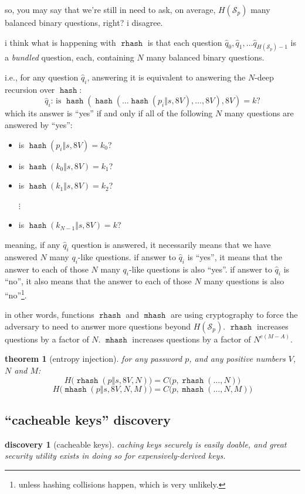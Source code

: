\documentclass[twocolumn]{article}
\newtheorem{theorem}{theorem}
\newtheorem{discovery}{discovery}
\DeclareMathOperator{\hash}{\mathtt{hash}}
\DeclareMathOperator{\rhash}{\mathtt{rhash}}
\DeclareMathOperator{\mhash}{\mathtt{mhash}}
\begin{document}
so, you may say that we're still in need to ask, on average,
$H(\mathcal{S}_p)$ many balanced binary questions, right?  i disagree.

i think what is happening with $\rhash$ is that each question $\hat q_0,
\hat q_1, \ldots \hat q_{H(\mathcal{S}_p)-1}$ is a \emph{bundled} question,
each, containing $N$ many balanced binary questions.

i.e., for any question $\hat q_i$, answering it is equivalent to answering
the $N$-deep recursion over $\hash$:
\[
    \text{$\hat q_i$: is }\hash(\hash(\ldots\hash(p_i \Vert s, 8V), \ldots,
    8V), 8V) = k \text{?}
\]
which its answer is ``yes'' if and only if all of the following $N$ many
questions are answered by ``yes'':
\begin{itemize}
    \item is $\hash(p_i \Vert s, 8V) = k_0$?
    \item is $\hash(k_0 \Vert s, 8V) = k_1$?
    \item is $\hash(k_1 \Vert s, 8V) = k_2$?

    $\vdots$

    \item is $\hash(k_{N-1} \Vert s, 8V) = k$?
\end{itemize}

meaning, if any $\hat q_i$ question is answered, it necessarily means that
we have answered $N$ many $q_i$-like questions.  if answer to $\hat q_i$ is
``yes'', it means that the answer to each of those $N$ many $q_i$-like
questions is also ``yes''.  if answer to $\hat q_i$ is ``no'', it also
means that the answer to each of those $N$ many questions is also
``no''\footnote{unless hashing collisions happen, which is very unlikely.}.

in other words, functions $\rhash$ and $\mhash$ are using cryptography to
force the adversary to need to answer more questions beyond
$H(\mathcal{S}_p)$.  $\rhash$ increases questions by a factor of $N$.
$\mhash$ increases questions by a factor of $N^{e(M-A)}$.

\begin{theorem}[entropy injection] \label{theorem_entropy_injection}
    for any password $p$, and any positive numbers $V$, $N$ and $M$:
    \[
        H\Big(\rhash(p\Vert s, 8V, N)\Big) = C\Big(p, \rhash(\ldots, N)\Big)
    \]
    \[
        H\Big(\mhash(p\Vert s, 8V, N, M)\Big) = C\Big(p, \mhash(\ldots, N,
        M)\Big)
    \]
\end{theorem}

\subsection{``cacheable keys'' discovery}
\begin{discovery}[cacheable keys]\label{discov_key_caching}
    caching keys securely is easily doable, and great security utility
    exists in doing so for expensively-derived keys.
\end{discovery}
\end{document}
